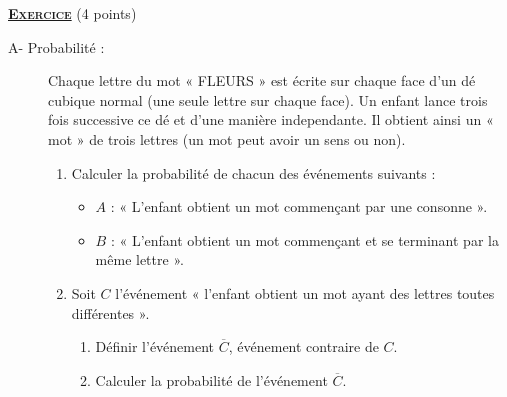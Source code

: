 \providecommand{\dx}{\mathrm{d}x}
\providecommand{\Re}[1]{\mathrm{Re}\left( #1 \right)}
\providecommand{\Im}[1]{\mathrm{Im}\left( #1 \right)}
\providecommand{\dt}{\mathrm{d}t}
\providecommand{\Ouv}{(O;\vec{u},\vec{v})}
\providecommand{\mes}[2]{\mathrm{mes}\left( \widehat{ \overrightarrow{#1} ; \overrightarrow{#2} } \right)}
\providecommand{\D}{(\mathscr{D})}
\providecommand{\Courbe}{(\mathscr{C})}
\providecommand{\congru}[3]{#1 \equi #2 \quad \left[ \mathrm{mod}~#3\right]}
%
\noindent \underline{\textsc{\textbf{Exercice}}} (4 points) \\%
      \begin{description}
            \item[A- Probabilit\'e :]
                  Chaque lettre du mot « FLEURS » est écrite sur chaque face d’un dé cubique normal 
                  (une seule lettre sur chaque face). 
                  Un enfant lance trois fois successive ce dé et d’une manière independante. 
                  Il obtient ainsi un « mot » de trois lettres (un mot peut avoir un sens ou non).
                  \begin{enumerate}
                        \item Calculer la probabilité de chacun des événements suivants :
                              \begin{itemize}
                                    \item $A$ : « L’enfant obtient un mot commençant par une consonne ».
                                    \item $B$ : «  L’enfant obtient un mot commençant et se terminant par la même lettre ».
                              \end{itemize}
                        \item Soit $C$ l’événement « l’enfant obtient un mot ayant des lettres toutes différentes ».
                              \begin{enumerate}
                                    \item Définir l’événement $\overline{C}$, événement contraire de $C$.
                                    \item Calculer la probabilité de l’événement $\overline{C}$.

\end{enumerate}
\end{enumerate}
\end{description}
